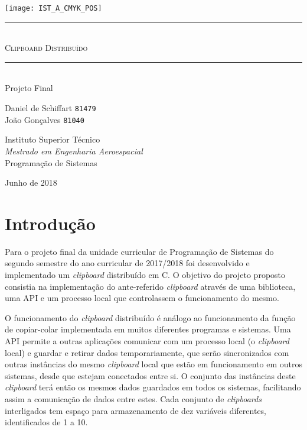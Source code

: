 \documentclass{article}
\begin{document}
\thispagestyle{empty}
	\texttt{[image: IST\_A\_CMYK\_POS]}
	
	\begin{center}
		\vspace{70mm} %
		\rule{\linewidth}{0.5pt} \\
		\vspace{2mm}
		\Huge \textsc{Clipboard Distribuído} \\
		\rule{\linewidth}{2pt} \\
		\vspace{8mm} %
		\LARGE Projeto Final
		
		\vspace{\fill} %
		\large
		Daniel de Schiffart \texttt{81479} \\
		João Gonçalves \texttt{81040}
		
		\vspace{10mm} %
		\Large Instituto Superior Técnico \\
		\textit{Mestrado em Engenharia Aeroespacial} \\
		\vspace{1mm}
		\large Programação de Sistemas
		
		\vspace{10mm} %
		\Large Junho de 2018
	\end{center}
\newpage

\section{Introdução}

Para o projeto final da unidade curricular de Programação de Sistemas do
segundo semestre do ano curricular de 2017/2018 foi desenvolvido e
implementado um \textit{clipboard} distribuído em C. O objetivo do
projeto proposto consistia na implementação do ante-referido 
\textit{clipboard} através de uma biblioteca, uma API e um processo
local que controlassem o funcionamento do mesmo.

O funcionamento do \textit{clipboard} distribuído é análogo ao
funcionamento da função de copiar-colar implementada em muitos diferentes
programas e sistemas. Uma API permite a outras aplicações comunicar com
um processo local (o \textit{clipboard} local) e guardar e retirar dados
temporariamente, que serão sincronizados com outras instâncias do mesmo
\textit{clipboard} local que estão em funcionamento em outros sistemas,
desde que estejam conectados entre si. O conjunto das instâncias deste
\textit{clipboard} terá então os mesmos dados guardados em todos os
sistemas, facilitando assim a comunicação de dados entre estes.
Cada conjunto de \textit{clipboards} interligados tem espaço para
armazenamento de dez variáveis diferentes, identificados de 1 a 10.
\end{document}
